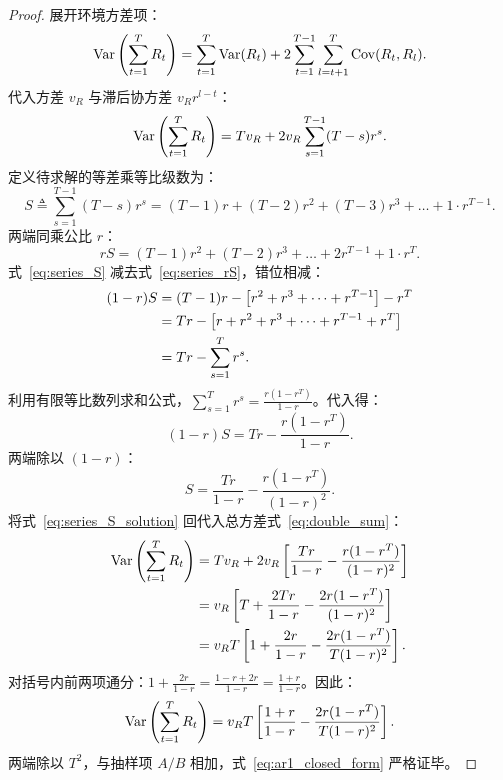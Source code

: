 \begin{proof}
展开环境方差项：
\begin{equation}
\operatorname{Var}\left( \sum_{t=1}^T R_t \right) = \sum_{t=1}^T \operatorname{Var}(R_t) + 2 \sum_{t=1}^{T-1} \sum_{l=t+1}^T \operatorname{Cov}(R_t, R_l).
\end{equation}
代入方差 $v_R$ 与滞后协方差 $v_R r^{l-t}$：
\begin{equation}
\operatorname{Var}\left( \sum_{t=1}^T R_t \right) = T v_R + 2 v_R \sum_{s=1}^{T-1} (T - s) r^s. \label{eq:double_sum}
\end{equation}
定义待求解的等差乘等比级数为：
\begin{equation}
S \triangleq \sum_{s=1}^{T-1} (T - s) r^s = (T-1)r + (T-2)r^2 + (T-3)r^3 + \dots + 1 \cdot r^{T-1}. \label{eq:series_S}
\end{equation}
两端同乘公比 $r$：
\begin{equation}
r S = (T-1)r^2 + (T-2)r^3 + \dots + 2 r^{T-1} + 1 \cdot r^T. \label{eq:series_rS}
\end{equation}
式~\eqref{eq:series_S} 减去式~\eqref{eq:series_rS}，错位相减：
\begin{align}
(1 - r) S &= (T-1)r - \left[ r^2 + r^3 + \dots + r^{T-1} \right] - r^T \notag \\
&= T r - \left[ r + r^2 + r^3 + \dots + r^{T-1} + r^T \right] \notag \\
&= T r - \sum_{s=1}^T r^s.
\end{align}
利用有限等比数列求和公式，$\sum_{s=1}^T r^s = \frac{r(1 - r^T)}{1 - r}$。代入得：
\begin{equation}
(1 - r) S = T r - \frac{r(1 - r^T)}{1 - r}.
\end{equation}
两端除以 $(1 - r)$：
\begin{equation}
S = \frac{T r}{1 - r} - \frac{r(1 - r^T)}{(1 - r)^2}. \label{eq:series_S_solution}
\end{equation}
将式~\eqref{eq:series_S_solution} 回代入总方差式~\eqref{eq:double_sum}：
\begin{align}
\operatorname{Var}\left( \sum_{t=1}^T R_t \right) &= T v_R + 2 v_R \left[ \frac{T r}{1 - r} - \frac{r(1 - r^T)}{(1 - r)^2} \right] \notag \\
&= v_R \left[ T + \frac{2 T r}{1 - r} - \frac{2 r(1 - r^T)}{(1 - r)^2} \right] \notag \\
&= v_R T \left[ 1 + \frac{2r}{1-r} - \frac{2r(1 - r^T)}{T(1-r)^2} \right].
\end{align}
对括号内前两项通分：$1 + \frac{2r}{1-r} = \frac{1-r+2r}{1-r} = \frac{1+r}{1-r}$。因此：
\begin{equation}
\operatorname{Var}\left( \sum_{t=1}^T R_t \right) = v_R T \left[ \frac{1+r}{1-r} - \frac{2r(1 - r^T)}{T(1-r)^2} \right].
\end{equation}
两端除以 $T^2$，与抽样项 $A/B$ 相加，式~\eqref{eq:ar1_closed_form} 严格证毕。
\end{proof}

